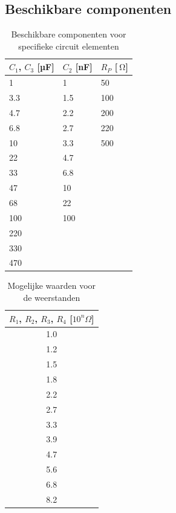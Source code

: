 \documentclass{report}
\begin{document}
\newpage
\begin{appendices}

\chapter{Beschikbare componenten}
\label{bescomp}


\begin{table}[h]
\centering
{}
\begin{tabular}{lll}
    \toprule
    $C_1$, $C_3$ [µF] & $C_2$ [nF] & $R_P$ [$\SI{}{\ohm}$] \\
    \midrule
    1 & 1 & 50 \\
    3.3 & 1.5 & 100\\ 
    4.7 & 2.2 & 200\\
    6.8 & 2.7 & 220\\
    10 & 3.3 & 500\\
    22 & 4.7 &\\
    33 & 6.8 &\\
    47 & 10 &\\
    68 & 22 &\\
    100 & 100&\\
    220&&\\
    330&&\\
    470&&\\
    \bottomrule
\end{tabular}
\caption{Beschikbare componenten voor specifieke circuit elementen}
\label{waardeconpot}
\end{table}


\begin{table}[h]
\centering
{}
\begin{tabular}{c}
    \toprule
    $R_1$, $R_2$, $R_3$, $R_4$ [$10^n\Omega$] \\
    \midrule
    1.0 \\
    1.2 \\
    1.5 \\
    1.8 \\
    2.2 \\
    2.7 \\
    3.3 \\
    3.9 \\
    4.7 \\
    5.6 \\
    6.8\\
    8.2\\
    \bottomrule
\end{tabular}
\caption{Mogelijke waarden voor de weerstanden}
\label{waardeweer}
\end{table}



\end{appendices}
\end{document}

